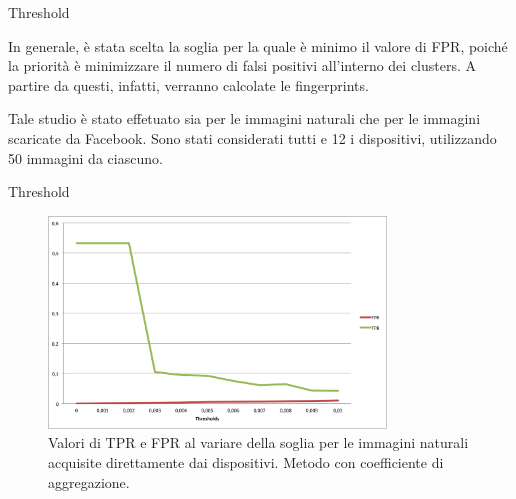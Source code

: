 \begin{tframe}{Threshold}

In generale, è stata scelta la soglia per la quale è minimo il valore di FPR, poiché la priorità è minimizzare il numero di falsi positivi all'interno dei clusters. A partire da questi, infatti, verranno calcolate le fingerprints.

\vspace{0.1in}

Tale studio è stato effetuato sia per le immagini naturali che per le immagini scaricate da Facebook. Sono stati considerati tutti e 12 i dispositivi, utilizzando 50 immagini da ciascuno.

\end{tframe}

\begin{tframe}{Threshold}

\begin{figure}[h]
\begin{center}
\includegraphics[width=0.8\textwidth]{../images/soglia_imgnat_AC.png}
\end{center}
  \caption{Valori di TPR e FPR al variare della soglia per le immagini naturali acquisite direttamente dai dispositivi. Metodo con coefficiente di aggregazione.}
\label{fig:soglia AC}
\end{figure}

\end{tframe}

